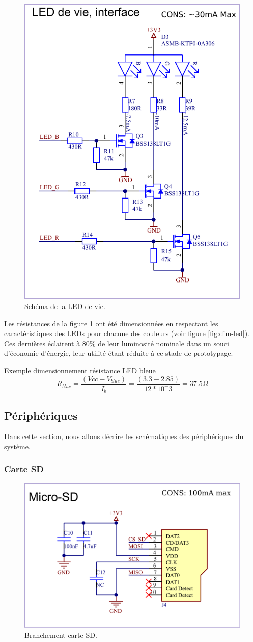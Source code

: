 \begin{figure}[h]
	\centering
	\includegraphics[width=0.4\linewidth]{../figures/etude/sch/LED-Vie}
	\caption{Schéma de la LED de vie.}
	\label{fig:led-vie}
\end{figure}

Les résistances de la figure \ref{fig:led-vie} ont été dimensionnées en respectant les caractéristiques des LEDs pour chacune des couleurs (voir figure \ref{fig:dim-led}). Ces dernières éclairent à 80\% de leur luminosité nominale dans un souci d'économie d'énergie, leur utilité étant réduite à ce stade de prototypage.

\begin{center}
	\underline{Exemple dimensionnement résistance LED bleue}
	\begin{equation*}
		R_{blue} = \frac{(Vcc - V_{blue})}{I_b} = \frac{(3.3 - 2.85)}{12*10^-3} = 37.5 \Omega
	\end{equation*}
\end{center}

\clearpage

\subsection{Périphériques} \label{ssec:Dev-Devices}
Dans cette section, nous allons décrire les schématiques des périphériques du système.
 
\subsubsection{Carte SD}

\begin{figure}[h]
	\centering
	\includegraphics[width=0.5\linewidth]{../figures/etude/sch/Carte-SD}
	\caption{Branchement carte SD.}
	\label{fig:carte-sd}
\end{figure}

